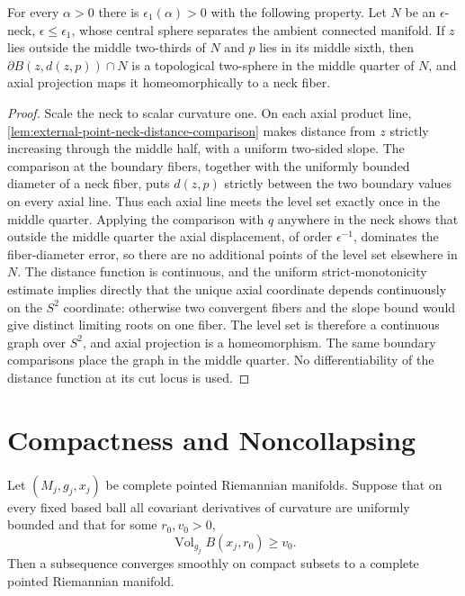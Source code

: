 \begin{lemma}
\label{lem:metric-sphere-crosses-neck-as-fiber}
\notready
For every $\alpha>0$ there is $\epsilon_1(\alpha)>0$ with the following
property.  Let $N$ be an $\epsilon$-neck, $\epsilon\le\epsilon_1$, whose
central sphere separates the ambient connected manifold.  If $z$ lies
outside the middle two-thirds of $N$ and $p$ lies in its middle sixth, then
$\partial B(z,d(z,p))\cap N$ is a topological two-sphere in the middle
quarter of $N$, and axial projection maps it homeomorphically to a neck
fiber.
\end{lemma}

\begin{proof}
Scale the neck to scalar curvature one.  On each axial product line,
\ref{lem:external-point-neck-distance-comparison} makes distance from $z$
strictly increasing through the middle half, with a uniform two-sided slope.
The comparison at the boundary fibers, together with the uniformly bounded
diameter of a neck fiber, puts $d(z,p)$ strictly between the two boundary
values on every axial line.  Thus each axial line meets the level set exactly
once in the middle quarter.  Applying the comparison with $q$ anywhere in
the neck shows that outside the middle quarter the axial displacement, of
order $\epsilon^{-1}$, dominates the fiber-diameter error, so there are no
additional points of the level set elsewhere in $N$.
The distance function is continuous, and the uniform strict-monotonicity
estimate implies directly that the unique axial coordinate depends
continuously on the $S^2$ coordinate: otherwise two convergent fibers and
the slope bound would give distinct limiting roots on one fiber.  The level
set is therefore a continuous graph over $S^2$, and axial projection is a
homeomorphism.  The same boundary comparisons place the graph in the middle
quarter.  No differentiability of the distance function at its cut locus is
used.
\end{proof}

\section{Compactness and Noncollapsing}

\begin{theorem}
\label{thm:pointed-riemannian-compactness}
\notready
Let $(M_j,g_j,x_j)$ be complete pointed Riemannian manifolds.  Suppose that
on every fixed based ball all covariant derivatives of curvature are
uniformly bounded and that for some $r_0,v_0>0$,
\[
 \operatorname{Vol}_{g_j}B(x_j,r_0)\ge v_0.
\]
Then a subsequence converges smoothly on compact subsets to a complete
pointed Riemannian manifold.
\end{theorem}

